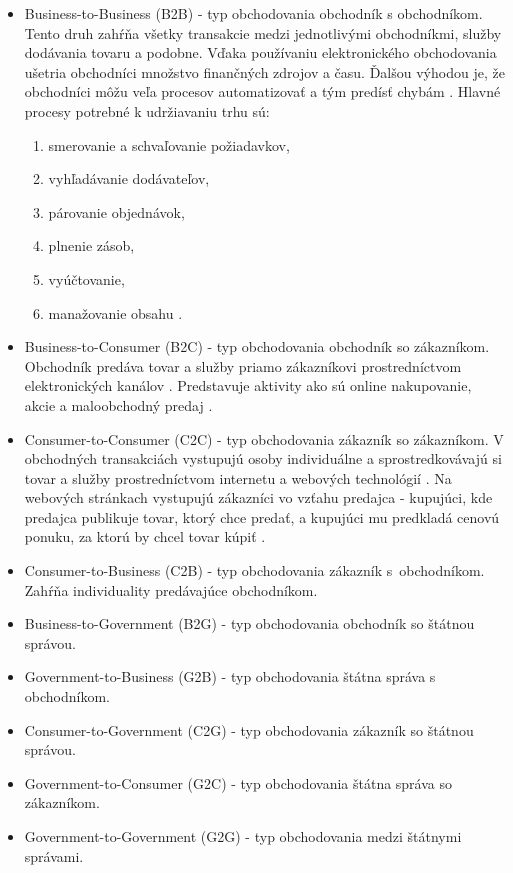 \documentclass[
  printed, %
  table,   %
  lof,     %
  nolot,     %
  twoside,  
]{fithesis3}
\begin{document}
\begin{itemize}
	\item Business-to-Business (B2B) - typ obchodovania obchodník s obchodníkom. Tento druh zahŕňa všetky transakcie medzi jednotlivými obchodníkmi, služby dodávania tovaru a podobne. Vďaka používaniu elektronického obchodovania ušetria obchodníci množstvo finančných zdrojov a času. Ďalšou výhodou je, že obchodníci môžu veľa procesov automatizovať a tým predísť chybám \cite{ec1}. Hlavné procesy potrebné k  udržiavaniu trhu sú:
	\begin{enumerate}
	 \item smerovanie a schvaľovanie požiadavkov,
	 \item vyhľadávanie dodávateľov,
	 \item párovanie objednávok,
	 \item plnenie zásob,
	 \item vyúčtovanie,
	 \item manažovanie obsahu \cite{ec2}.
	\end{enumerate}
	
	\item Business-to-Consumer (B2C) - typ obchodovania obchodník so zákazníkom. Obchodník predáva tovar a služby priamo zákazníkovi prostredníctvom elektronických kanálov \cite{ec1}. Predstavuje aktivity ako sú online nakupovanie, akcie a maloobchodný predaj \cite{ec2}.
	\item Consumer-to-Consumer (C2C) - typ obchodovania zákazník so zákazníkom.  V obchodných transakciách vystupujú osoby individuálne a sprostredkovávajú si tovar a služby prostredníctvom internetu a webových technológií \cite{ec1}. Na webových stránkach vystupujú zákazníci vo vzťahu predajca - kupujúci, kde predajca publikuje tovar, ktorý chce predať, a kupujúci mu predkladá cenovú ponuku, za ktorú by chcel tovar kúpiť \cite{ec2}.
	\item Consumer-to-Business (C2B) - typ obchodovania zákazník s~obchodníkom. Zahŕňa individuality predávajúce obchodníkom\cite{ec1}.
	\item Business-to-Government (B2G) - typ obchodovania obchodník so štátnou správou.
	\item Government-to-Business (G2B) - typ obchodovania štátna správa s obchodníkom.
	\item Consumer-to-Government (C2G) - typ obchodovania zákazník so štátnou správou.
	\item Government-to-Consumer (G2C) - typ obchodovania štátna správa so zákazníkom.
	\item Government-to-Government (G2G) - typ obchodovania medzi štátnymi správami.
\end{itemize}
\end{document}
